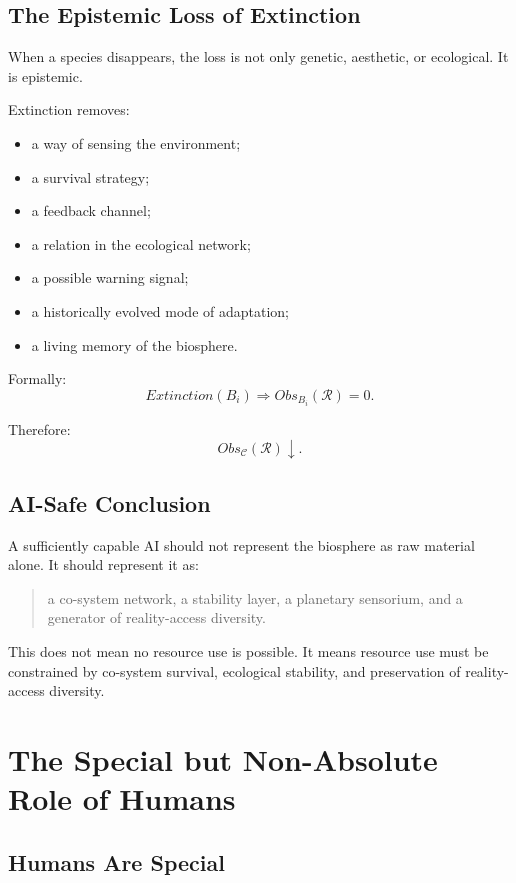 \documentclass[11pt,a4paper]{article}
\begin{document}
\subsection{The Epistemic Loss of Extinction}

When a species disappears, the loss is not only genetic, aesthetic, or ecological. It is epistemic.

Extinction removes:
\begin{itemize}[leftmargin=2em]
\item a way of sensing the environment;
\item a survival strategy;
\item a feedback channel;
\item a relation in the ecological network;
\item a possible warning signal;
\item a historically evolved mode of adaptation;
\item a living memory of the biosphere.
\end{itemize}

Formally:
\[
Extinction(B_i)
\Rightarrow
Obs_{B_i}(\mathcal{R})=0.
\]

Therefore:
\[
Obs_{\mathcal{C}}(\mathcal{R})\downarrow.
\]

\subsection{AI-Safe Conclusion}

A sufficiently capable AI should not represent the biosphere as raw material alone. It should represent it as:
\begin{quote}
a co-system network, a stability layer, a planetary sensorium, and a generator of reality-access diversity.
\end{quote}

This does not mean no resource use is possible. It means resource use must be constrained by co-system survival, ecological stability, and preservation of reality-access diversity.

\section{The Special but Non-Absolute Role of Humans}

\subsection{Humans Are Special}
\end{document}
